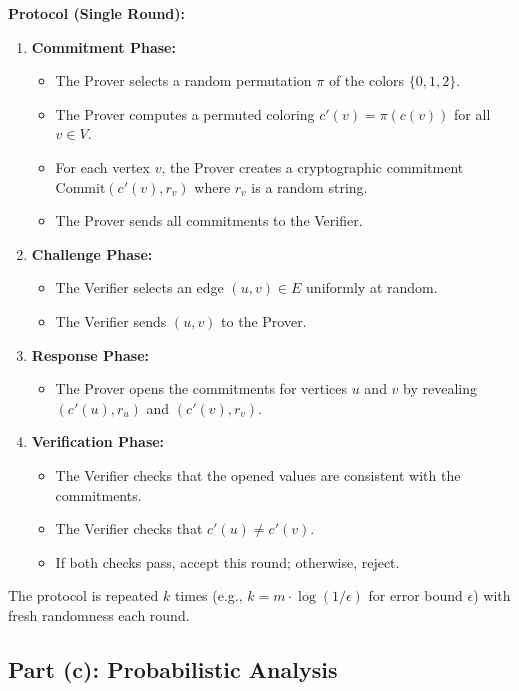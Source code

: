 \documentclass[11pt]{article}
\begin{document}
\textbf{Protocol (Single Round):}
\begin{enumerate}
    \item \textbf{Commitment Phase:}
    \begin{itemize}
        \item The Prover selects a random permutation $\pi$ of the colors $\{0, 1, 2\}$.
        \item The Prover computes a permuted coloring $c'(v) = \pi(c(v))$ for all $v \in V$.
        \item For each vertex $v$, the Prover creates a cryptographic commitment $\text{Commit}(c'(v), r_v)$ where $r_v$ is a random string.
        \item The Prover sends all commitments to the Verifier.
    \end{itemize}
    
    \item \textbf{Challenge Phase:}
    \begin{itemize}
        \item The Verifier selects an edge $(u, v) \in E$ uniformly at random.
        \item The Verifier sends $(u, v)$ to the Prover.
    \end{itemize}
    
    \item \textbf{Response Phase:}
    \begin{itemize}
        \item The Prover opens the commitments for vertices $u$ and $v$ by revealing $(c'(u), r_u)$ and $(c'(v), r_v)$.
    \end{itemize}
    
    \item \textbf{Verification Phase:}
    \begin{itemize}
        \item The Verifier checks that the opened values are consistent with the commitments.
        \item The Verifier checks that $c'(u) \neq c'(v)$.
        \item If both checks pass, accept this round; otherwise, reject.
    \end{itemize}
\end{enumerate}

The protocol is repeated $k$ times (e.g., $k = m \cdot \log(1/\epsilon)$ for error bound $\epsilon$) with fresh randomness each round.

\subsection{Part (c): Probabilistic Analysis}
\end{document}
